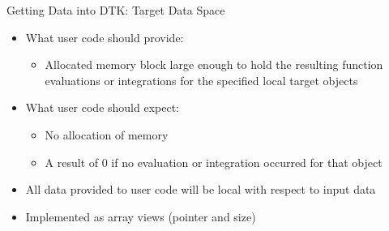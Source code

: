\documentclass{beamer}
\begin{document}
\begin{frame}{Getting Data into DTK: Target Data Space}

  \begin{itemize}
    \item What user code should provide:
      \medskip
      \begin{itemize}
      \item Allocated memory block large enough to hold the resulting
        function evaluations or integrations for the specified local
        target objects
      \end{itemize}
    \item What user code should expect:
      \medskip
      \begin{itemize}
      \item No allocation of memory
      \item A result of 0 if no evaluation or integration occurred for
        that object
      \end{itemize}
      \medskip
    \item All data provided to user code will be local with respect to
      input data
    \item Implemented as array views (pointer and size)
  \end{itemize}

\end{frame}
\end{document}
